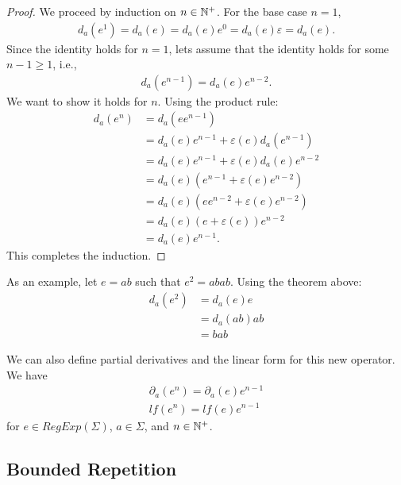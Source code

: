 \begin{proof}
	We proceed by induction on $n \in {\mathbb{N}^{+}}$. For the base case \( n = 1 \),
	\begin{align*}
		d_a(e^1) = d_a(e) = d_a(e)e^0 = d_a(e)\varepsilon = d_a(e).
	\end{align*}
	Since the identity holds for \(n = 1\), lets assume that the identity holds for some \(n-1 \geq 1\), i.e.,
	\begin{align*}
		d_a(e^{n-1}) = d_a(e)e^{n-2}.
	\end{align*}
	We want to show it holds for \(n\). Using the product rule:
	\begin{align*}
		d_a(e^n) &= d_a(ee^{n-1}) \\
		&= d_a(e) e^{n-1} + \varepsilon(e) d_a(e^{n-1}) \\
		&= d_a(e) e^{n-1} + \varepsilon(e) d_a(e) e^{n-2} \\
		&= d_a(e) \left(e^{n-1} + \varepsilon(e) e^{n-2}\right) \\
		&= d_a(e) \left(ee^{n-2} + \varepsilon(e) e^{n-2}\right) \\
		&= d_a(e) (e + \varepsilon(e))e^{n-2} \\
		&= d_a(e) e^{n-1}.
	\end{align*}
	This completes the induction.
\end{proof}

As an example, let $e = ab$ such that $e^2 = abab$. Using the theorem above:
\begin{align*}
	d_a(e^2) &= d_a(e)e \\
	&= d_a(ab)ab  \\
	&= bab
\end{align*}


We can also define partial derivatives and the linear form for this new operator. We have
\begin{gather*}
	\partial_a(e^n) = \partial_a(e)e^{n-1} \\
	lf(e^n) = lf(e)e^{n-1}
\end{gather*}
for $e \in RegExp(\Sigma)$, $a \in \Sigma$, and $n \in {\mathbb{N}^{+}}$.

\subsection{Bounded Repetition}

